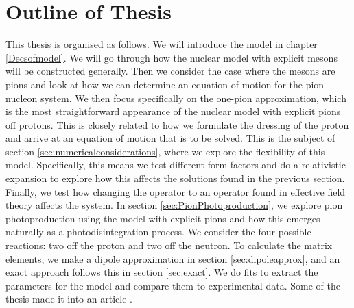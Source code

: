 \section{Outline of Thesis}
This thesis is organised as follows. We will introduce the model in chapter \ref{Decsofmodel}. We will go through how the nuclear model with explicit mesons will be constructed generally. Then we consider the case where the mesons are pions and look at how we can determine an equation of motion for the pion-nucleon system. We then focus specifically on the one-pion approximation, which is the most straightforward appearance of the nuclear model with explicit pions off protons. This is closely related to how we formulate the dressing of the proton and arrive at an equation of motion that is to be solved. This is the subject of section \ref{sec:numericalconsiderations}, where we explore the flexibility of this model. Specifically, this means we test different form factors and do a relativistic expansion to explore how this affects the solutions found in the previous section. Finally, we test how changing the operator to an operator found in effective field theory affects the system. In section \ref{sec:PionPhotoproduction}, we explore pion photoproduction using the model with explicit pions and how this emerges naturally as a photodisintegration process. We consider the four possible reactions: two off the proton and two off the neutron. To calculate the matrix elements, we make a dipole approximation in section \ref{sec:dipoleapprox}, and an exact approach follows this in section \ref{sec:exact}. We do fits to extract the parameters for the model and compare them to experimental data. Some of the thesis made it into an article \cite{ThresholdPion}.
